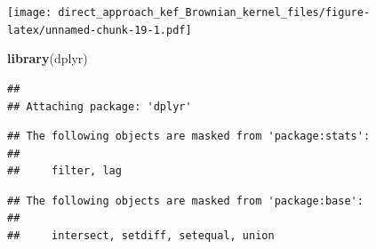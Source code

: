 \documentclass[
]{article}
\newenvironment{Shaded}{\begin{snugshade}}{\end{snugshade}}
\newcommand{\FunctionTok}[1]{\textcolor[rgb]{0.13,0.29,0.53}{\textbf{#1}}}
\newcommand{\NormalTok}[1]{#1}
\begin{document}
\texttt{[image: direct\_approach\_kef\_Brownian\_kernel\_files/figure-latex/unnamed-chunk-19-1.pdf]}

\begin{Shaded}
\begin{Highlighting}[]
\FunctionTok{library}\NormalTok{(dplyr)}
\end{Highlighting}
\end{Shaded}

\begin{verbatim}
## 
## Attaching package: 'dplyr'
\end{verbatim}

\begin{verbatim}
## The following objects are masked from 'package:stats':
## 
##     filter, lag
\end{verbatim}

\begin{verbatim}
## The following objects are masked from 'package:base':
## 
##     intersect, setdiff, setequal, union
\end{verbatim}
\end{document}
